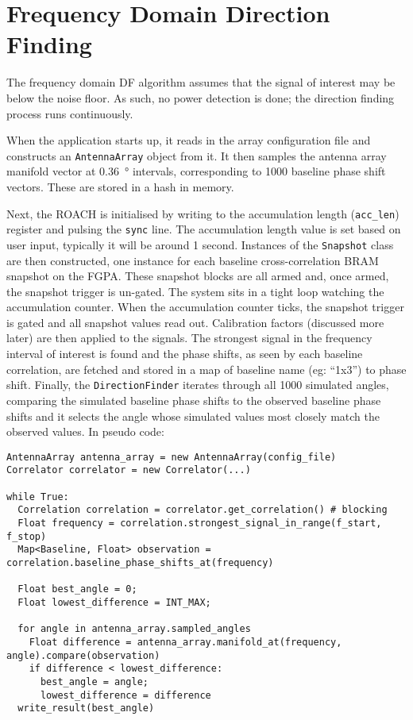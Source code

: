 \section{Frequency Domain Direction Finding}
The frequency domain DF algorithm assumes that the signal of interest may be below the noise floor. As such, no power detection is done; the direction finding process runs continuously.

When the application starts up, it reads in the array configuration file and constructs an \lstinline{AntennaArray} object from it. It then samples the antenna array manifold vector at \SI{0.36}{\degree} intervals, corresponding to 1000 baseline phase shift vectors. These are stored in a hash in memory. 

Next, the ROACH is initialised by writing to the accumulation length (\lstinline{acc_len}) register and pulsing the \lstinline{sync} line. The accumulation length value is set based on user input, typically it will be around 1 second. Instances of the \lstinline{Snapshot} class are then constructed, one instance for each baseline cross-correlation BRAM snapshot on the FGPA. These snapshot blocks are all armed and, once armed, the snapshot trigger is un-gated. The system sits in a tight loop watching the accumulation counter. When the accumulation counter ticks, the snapshot trigger is gated and all snapshot values read out. Calibration factors (discussed more later) are then applied to the signals. The strongest signal in the frequency interval of interest is found and the phase shifts, as seen by each baseline correlation, are fetched and stored in a map of baseline name (eg: ``1x3'')  to phase shift. Finally, the \lstinline{DirectionFinder} iterates through all 1000 simulated angles, comparing the simulated baseline phase shifts to the observed baseline phase shifts and it selects the angle whose simulated values most closely match the observed values. In pseudo code:

\begin{lstlisting}
AntennaArray antenna_array = new AntennaArray(config_file)
Correlator correlator = new Correlator(...)

while True:
  Correlation correlation = correlator.get_correlation() # blocking
  Float frequency = correlation.strongest_signal_in_range(f_start, f_stop)
  Map<Baseline, Float> observation = correlation.baseline_phase_shifts_at(frequency)

  Float best_angle = 0;
  Float lowest_difference = INT_MAX;

  for angle in antenna_array.sampled_angles
    Float difference = antenna_array.manifold_at(frequency, angle).compare(observation)
    if difference < lowest_difference:
      best_angle = angle;
      lowest_difference = difference
  write_result(best_angle)
\end{lstlisting}

